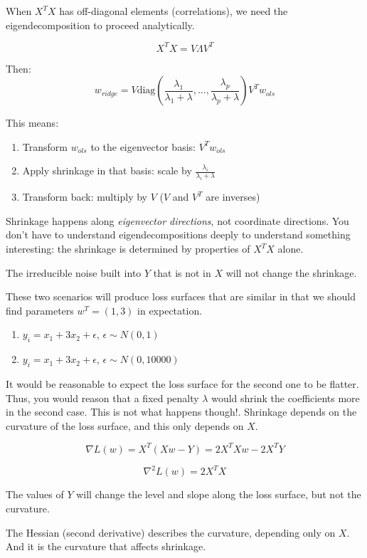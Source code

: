 When $X^TX$ has off-diagonal elements (correlations), we need the eigendecomposition to proceed analytically.

$$X^TX = V\Lambda V^T$$

Then:
$$w_{ridge} = V \text{diag}\left(\frac{\lambda_1}{\lambda_1 + \lambda}, \ldots, \frac{\lambda_p}{\lambda_p + \lambda}\right) V^T w_{ols}$$

This means:
\begin{enumerate}
    \item Transform $w_{ols}$ to the eigenvector basis: $V^T w_{ols}$
    \item Apply shrinkage in that basis: scale by $\frac{\lambda_i}{\lambda_i + \lambda}$  
    \item Transform back: multiply by $V$ ($V$ and $V^T$ are inverses)
\end{enumerate}

Shrinkage happens along \emph{eigenvector directions}, not coordinate directions. You don't have to understand eigendecompositions deeply to understand something interesting: the shrinkage is determined by properties of $X^TX$ alone.

The irreducible noise built into $Y$ that is not in $X$ will not change the shrinkage. 


These two scenarios will produce loss surfaces that are similar in that we should find parameters $w^T = (1, 3)$ in expectation. 

\begin{enumerate}
    \item $y_i = x_1 + 3x_2 + \epsilon$, $\epsilon \sim N(0,1)$
    \item $y_i = x_1 + 3x_2 + \epsilon$, $\epsilon \sim N(0,10000)$
\end{enumerate}

It would be reasonable to expect the loss surface for the second one to be flatter. Thus, you would reason that a fixed penalty $\lambda$ would shrink the coefficients more in the second case. This is not what happens though!.
Shrinkage depends on the curvature of the loss surface, and this only depends on $X$. 

$$\nabla L(w) = X^T(Xw - Y) = 2X^TXw - 2X^TY$$

$$\nabla^2 L(w) = 2X^TX$$

The values of $Y$ will change the level and slope along the loss surface, but not the curvature.

The Hessian (second derivative) describes the curvature, depending only on $X$. And it is the curvature that affects shrinkage. 


